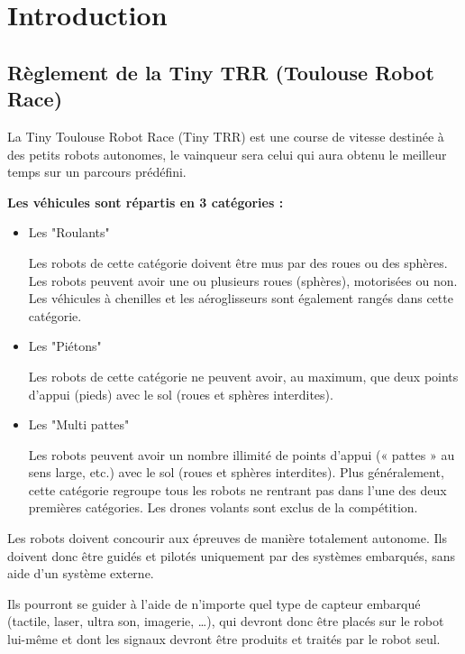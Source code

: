 \documentclass[a4paper,12pt]{book}
\begin{document}

\tableofcontents

\chapter{Introduction}

\section{Règlement de la Tiny TRR (Toulouse Robot Race)}
La Tiny Toulouse Robot Race (Tiny TRR) est une course de vitesse destinée à des petits robots autonomes, le vainqueur sera celui qui aura obtenu le meilleur temps sur un parcours prédéfini.
\vspace{1em}

\textbf{Les véhicules sont répartis en 3 catégories :}

\begin{itemize}
  \item Les "Roulants"
  
  Les robots de cette catégorie doivent être mus par des roues ou des sphères. Les robots peuvent avoir une ou plusieurs roues (sphères), motorisées ou non. Les véhicules à chenilles et les aéroglisseurs sont également rangés dans cette catégorie.
  \item Les "Piétons"
  
  Les robots de cette catégorie ne peuvent avoir, au maximum, que deux points d’appui (pieds) avec le sol (roues et sphères interdites).
  \item Les "Multi pattes"
  
  Les robots peuvent avoir un nombre illimité de points d’appui (« pattes » au sens large, etc.) avec le sol (roues et sphères interdites). Plus généralement, cette catégorie regroupe tous les robots ne rentrant pas dans l’une des deux premières catégories. Les drones volants sont exclus de la compétition.
\end{itemize}
\vspace{1em}

Les robots doivent concourir aux épreuves de manière totalement autonome. Ils doivent donc être guidés et pilotés uniquement par des systèmes embarqués, sans aide d’un système externe.
\vspace{1em}

Ils pourront se guider à l’aide de n’importe quel type de capteur embarqué (tactile, laser, ultra son, imagerie, …), qui devront donc être placés sur le robot lui-même et dont les signaux devront être produits et traités par le robot seul.
\end{document}
